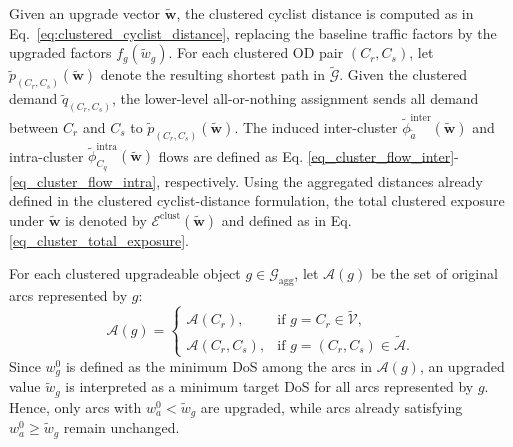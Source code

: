 \documentclass[lettersize,journal]{IEEEtran}
\begin{document}
Given an upgrade vector $\tilde{\mathbf{w}}$, the clustered cyclist distance is
computed as in Eq.~\eqref{eq:clustered_cyclist_distance}, replacing the baseline
traffic factors by the upgraded factors $f_g(\tilde{w}_g)$. For each clustered OD
pair $(C_r,C_s)$, let
$\tilde{p}_{(C_r,C_s)}(\tilde{\mathbf{w}})$ denote the resulting shortest path in
$\tilde{\mathcal{G}}$. Given the clustered demand $\tilde{q}_{(C_r,C_s)}$, the lower-level
all-or-nothing assignment sends all demand between $C_r$ and $C_s$ to
$\tilde{p}_{(C_r,C_s)}(\tilde{\mathbf{w}})$. The induced inter-cluster $\tilde{\phi}^{\mathrm{inter}}_{\tilde{a}}(\tilde{\mathbf{w}})$ and intra-cluster $\tilde{\phi}^{\mathrm{intra}}_{C_q}(\tilde{\mathbf{w}})$
flows are defined as Eq. \eqref{eq_cluster_flow_inter}-\eqref{eq_cluster_flow_intra}, respectively. Using the aggregated distances already defined in the clustered cyclist-distance
formulation, the total clustered exposure under $\tilde{\mathbf{w}}$ is denoted by $\mathcal{E}^{\mathrm{clust}}(\tilde{\mathbf{w}})$ and defined as in Eq. \eqref{eq_cluster_total_exposure}.

For each clustered upgradeable object
$g\in\mathcal{G}_{\mathrm{agg}}$, let $\mathcal{A}(g)$ be the set of original
arcs represented by $g$:
\[
\mathcal{A}(g)
=
\begin{cases}
\mathcal{A}(C_r),
& \text{if } g=C_r\in\tilde{\mathcal{V}}, \\[0.4em]
\mathcal{A}(C_r,C_s),
& \text{if } g=(C_r,C_s)\in\tilde{\mathcal{A}}.
\end{cases}
\]
Since $w_g^0$ is defined as the minimum DoS among the arcs in
$\mathcal{A}(g)$, an upgraded value $\tilde{w}_g$ is interpreted as a minimum
target DoS for all arcs represented by $g$. Hence, only arcs with
$w_a^0<\tilde{w}_g$ are upgraded, while arcs already satisfying
$w_a^0\geq\tilde{w}_g$ remain unchanged.
\end{document}
